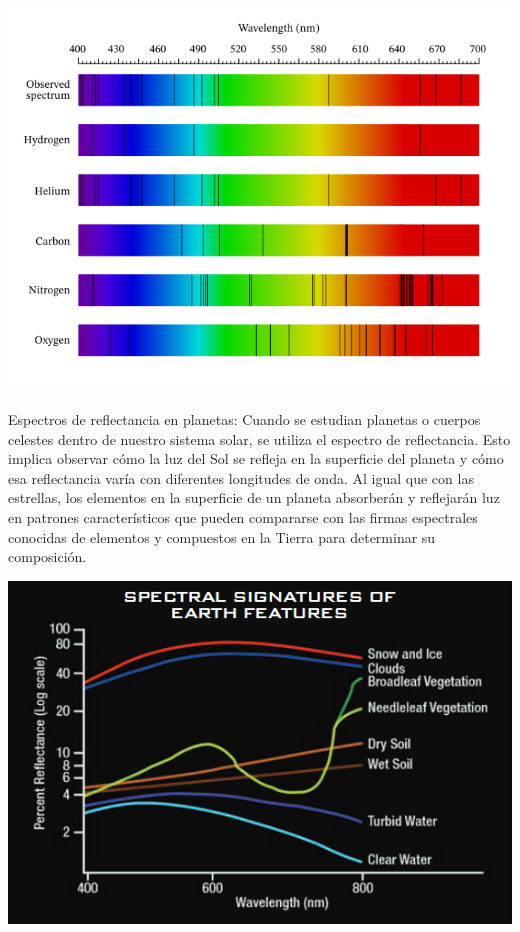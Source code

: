 \documentclass[a4paper,12pt]{article}
\newenvironment{Figure}
  {\par\medskip\noindent\minipage{\linewidth}}
  {\endminipage\par\medskip}
\begin{document}
\begin{multicols*}{2}
\begin{Figure}
    \centering
    \includegraphics[width=1\linewidth]{AbsorbSpectrum.png}
    \label{fig: AbsorbSpectrum}
\end{Figure}

Espectros de reflectancia en planetas: Cuando se estudian planetas o cuerpos celestes dentro de nuestro sistema solar, se utiliza el espectro de reflectancia. Esto implica observar cómo la luz del Sol se refleja en la superficie del planeta y cómo esa reflectancia varía con diferentes longitudes de onda. Al igual que con las estrellas, los elementos en la superficie de un planeta absorberán y reflejarán luz en patrones característicos que pueden compararse con las firmas espectrales conocidas de elementos y compuestos en la Tierra para determinar su composición.

\begin{Figure}
    \centering
    \includegraphics[width=0.9\linewidth]{refSpectrum.png}
    \label{fig: RefSpectrum}
\end{Figure}


\end{multicols*}
\end{document}
